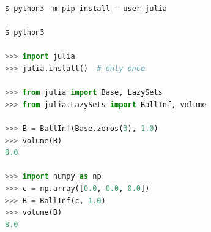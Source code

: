 	\begin{lstlisting}[language=python]
$ python3 -m pip install --user julia

$ python3

>>> import julia
>>> julia.install()  # only once

>>> from julia import Base, LazySets
>>> from julia.LazySets import BallInf, volume

>>> B = BallInf(Base.zeros(3), 1.0)
>>> volume(B)
8.0

>>> import numpy as np
>>> c = np.array([0.0, 0.0, 0.0])
>>> B = BallInf(c, 1.0)
>>> volume(B)
8.0
	\end{lstlisting}
